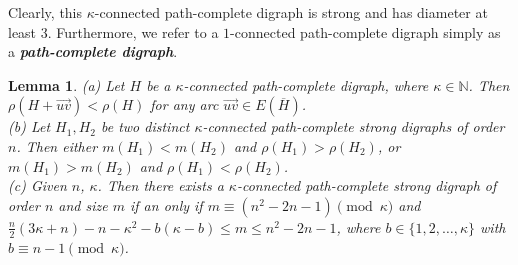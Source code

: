 \documentclass[a4paper,11pt]{article}
\newtheorem{lemma}[theorem]%
{Lemma}
\begin{document}
Clearly, this $\kappa$-connected path-complete digraph is strong and has diameter  at least 3. Furthermore, we refer to a $1$-connected path-complete digraph simply as a \textbf{\textit{path-complete digraph}}.


\begin{lemma}\label{la:size-vs-remoteness-in-kappa-connected-pc-digraph}
	(a) Let $H$ be a $\kappa$-connected path-complete digraph, where $\kappa \in \mathbb{N}$. Then 
$\rho(H+\overrightarrow{uv}) < \rho(H)$ for any arc $ \overrightarrow{uv} \in E(\overline{H})$. \\
(b) Let $H_1, H_2$ be two distinct $\kappa$-connected path-complete strong digraphs of order $n$. Then either $m(H_1) < m(H_2)$ and $\rho(H_1) > \rho(H_2)$, or $m(H_1) > m(H_2)$ 
and $\rho(H_1) < \rho(H_2)$. \\
 (c) Given $n$, $\kappa$. Then there exists a $\kappa$-connected path-complete strong digraph of order $n$ and size $m$ if an only if $m \equiv (n^2-2n-1) \pmod{\kappa} $ and $ \frac{n}{2}(3\kappa+n)-n-\kappa^2-b(\kappa-b) \leq m \leq n^2-2n-1$, where $b \in \{1,2,\ldots, \kappa\}$ with
$b \equiv n-1 \pmod{\kappa}$.
\end{lemma}
\end{document}
